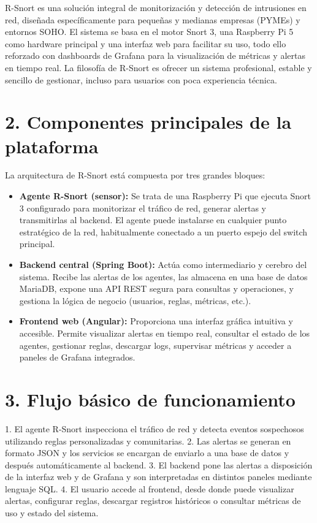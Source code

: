 \documentclass[11pt,a4paper,twoside]{report}
\begin{document}
R-Snort es una solución integral de monitorización y detección de intrusiones en red, diseñada específicamente para pequeñas y medianas empresas (PYMEs) y entornos SOHO. El sistema se basa en el motor Snort 3, una Raspberry Pi 5 como hardware principal y una interfaz web para facilitar su uso, todo ello reforzado con dashboards de Grafana para la visualización de métricas y alertas en tiempo real. La filosofía de R-Snort es ofrecer un sistema profesional, estable y sencillo de gestionar, incluso para usuarios con poca experiencia técnica.

\section*{2. Componentes principales de la plataforma}

La arquitectura de R-Snort está compuesta por tres grandes bloques:

\begin{itemize}
	\item \textbf{Agente R-Snort (sensor):} Se trata de una Raspberry Pi que ejecuta Snort 3 configurado para monitorizar el tráfico de red, generar alertas y transmitirlas al backend. El agente puede instalarse en cualquier punto estratégico de la red, habitualmente conectado a un puerto espejo del switch principal.
	\item \textbf{Backend central (Spring Boot):} Actúa como intermediario y cerebro del sistema. Recibe las alertas de los agentes, las almacena en una base de datos MariaDB, expone una API REST segura para consultas y operaciones, y gestiona la lógica de negocio (usuarios, reglas, métricas, etc.).
	\item \textbf{Frontend web (Angular):} Proporciona una interfaz gráfica intuitiva y accesible. Permite visualizar alertas en tiempo real, consultar el estado de los agentes, gestionar reglas, descargar logs, supervisar métricas y acceder a paneles de Grafana integrados.
\end{itemize}

\section*{3. Flujo básico de funcionamiento}

1. El agente R-Snort inspecciona el tráfico de red y detecta eventos sospechosos utilizando reglas personalizadas y comunitarias.
2. Las alertas se generan en formato JSON y los servicios se encargan de enviarlo a una base de datos y después automáticamente al backend.
3. El backend pone las alertas a disposición de la interfaz web y de Grafana y son interpretadas en distintos paneles mediante lenguaje SQL.
4. El usuario accede al frontend, desde donde puede visualizar alertas, configurar reglas, descargar registros históricos o consultar métricas de uso y estado del sistema.
\end{document}
